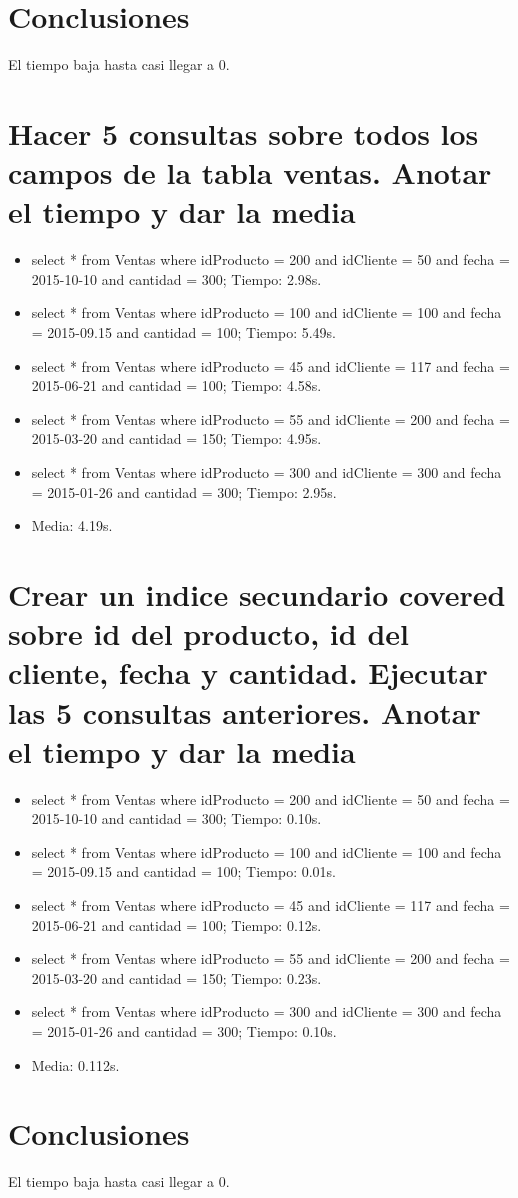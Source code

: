 \documentclass[a4paper,12pt]{article}
\begin{document}
  \section{Conclusiones}
    
   El tiempo baja hasta casi llegar a 0.
  
  \section{Hacer 5 consultas sobre todos los campos de la tabla ventas. Anotar el tiempo y dar la media}
  
  \begin{itemize}
   \item select * from Ventas where idProducto = 200 and idCliente = 50 and fecha = 2015-10-10 and cantidad = 300; Tiempo: 2.98s.
   \item select * from Ventas where idProducto = 100 and idCliente = 100 and fecha = 2015-09.15 and cantidad = 100; Tiempo: 5.49s.
   \item select * from Ventas where idProducto = 45 and idCliente = 117 and fecha = 2015-06-21 and cantidad = 100; Tiempo: 4.58s.
   \item select * from Ventas where idProducto = 55 and idCliente = 200 and fecha = 2015-03-20 and cantidad = 150; Tiempo: 4.95s.
   \item select * from Ventas where idProducto = 300 and idCliente = 300 and fecha = 2015-01-26 and cantidad = 300; Tiempo: 2.95s.
   \item Media: 4.19s.
  \end{itemize}

  \section{Crear un indice secundario covered sobre id del producto, id del cliente, fecha y cantidad.
  Ejecutar las 5 consultas anteriores. Anotar el tiempo y dar la media}
  
  \begin{itemize}
   \item select * from Ventas where idProducto = 200 and idCliente = 50 and fecha = 2015-10-10 and cantidad = 300; Tiempo: 0.10s.
   \item select * from Ventas where idProducto = 100 and idCliente = 100 and fecha = 2015-09.15 and cantidad = 100; Tiempo: 0.01s.
   \item select * from Ventas where idProducto = 45 and idCliente = 117 and fecha = 2015-06-21 and cantidad = 100; Tiempo: 0.12s.
   \item select * from Ventas where idProducto = 55 and idCliente = 200 and fecha = 2015-03-20 and cantidad = 150; Tiempo: 0.23s.
   \item select * from Ventas where idProducto = 300 and idCliente = 300 and fecha = 2015-01-26 and cantidad = 300; Tiempo: 0.10s.
   \item Media: 0.112s.
  \end{itemize}
  
  \section{Conclusiones}
  
  El tiempo baja hasta casi llegar a 0.
  
\end{document}
